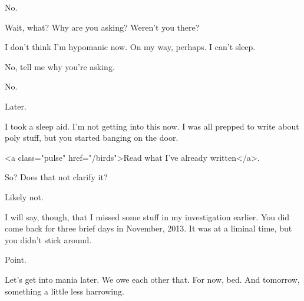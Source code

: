 
No.

Wait, what? Why are you asking? Weren't you there?


I don't think I'm hypomanic now. On my way, perhaps. I can't sleep.


No, tell me why you're asking.


No.

Later.

I took a sleep aid. I'm not getting into this now. I was all prepped to write about poly stuff, but you started banging on the door.

<a class="pulse" href="/birds">Read what I've already written</a>.


So? Does that not clarify it?


Likely not.

I will say, though, that I missed some stuff in my investigation earlier. You did come back for three brief days in November, 2013. It was at a liminal time, but you didn't stick around.


Point.

Let's get into mania later. We owe each other that. For now, bed. And tomorrow, something a little less harrowing.

